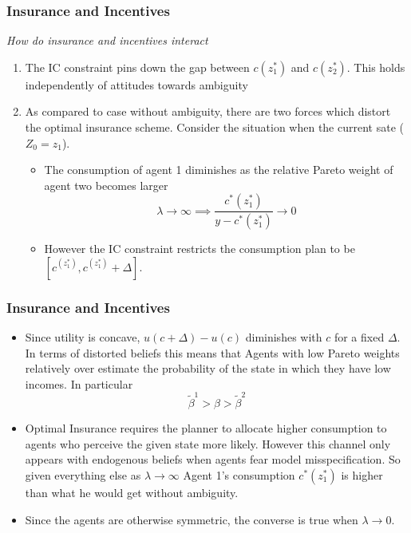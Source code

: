 \documentclass{beamer}
\begin{document}
\begin{frame}
\frametitle{Insurance and Incentives} 
\emph{How do insurance and incentives interact}


\begin{enumerate}
	\item The IC constraint pins down the gap between $c(z^*_1)$ and $c(z^*_2)$. This holds independently  of attitudes towards ambiguity
	
	\item As compared to case without ambiguity, there are two forces which distort the optimal insurance scheme. Consider the situation when the current sate ($Z_0=z_1$). 
	
\begin{itemize}
	\item The consumption of agent 1 diminishes as the relative Pareto weight of agent two becomes larger
	\[\lambda \to \infty \implies \frac{c^*(z^*_1)}{y-c^*(z^*_1)} \to 0\]
	\item However the IC constraint restricts the consumption plan to be $[c^(z^*_1),c^(z^*_1)+\Delta]$. 
	
	
	
	\end{itemize}
	\end{enumerate}
	
	\end{frame}
	\begin{frame}
	\frametitle{Insurance and Incentives} 
	
	\begin{itemize}
	\item Since utility is concave, $u(c+\Delta)-u(c)$ diminishes  with  $c$  for a fixed $\Delta$. In terms of distorted beliefs this means that Agents with low Pareto weights relatively over estimate the probability of the state in which they have low incomes. In particular
	\[\tilde{\beta}^1 > \beta > \tilde{\beta}^2\]
	\item Optimal Insurance requires the planner to allocate higher consumption to agents who perceive the given state more likely. However this channel only appears with endogenous beliefs when agents fear model misspecification. So given everything else as $\lambda \to \infty $ Agent 1's consumption $c^*(z^*_1)$ is higher than what he would get without ambiguity. 
	\item Since the agents are otherwise symmetric, the converse is true when $\lambda \to 0$. 
	
	
	
	
	
	
\end{itemize}
	
	
	
	

\end{frame}
\end{document}
